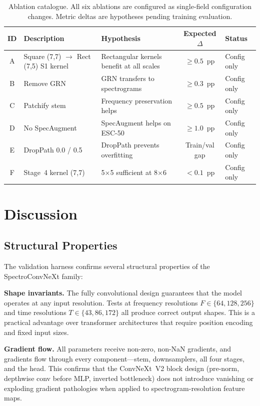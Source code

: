 \documentclass{article}
\begin{document}
\begin{table}[h]
  \centering
  \caption{Ablation catalogue. All six ablations are configured as single-field
  configuration changes. Metric deltas are hypotheses pending training
  evaluation.}
  \label{tab:ablations}
  \small
  \begin{tabular}{cp{3cm}p{2.5cm}c}
  \toprule
  \textbf{ID} & \textbf{Description} & \textbf{Hypothesis} & \textbf{Expected $\Delta$} & \textbf{Status} \\
  \midrule
  A & Square (7,7) $\to$ Rect (7,5) S1 kernel & Rectangular kernels benefit at all scales & $\geq 0.5$~pp & Config only \\
  B & Remove GRN & GRN transfers to spectrograms & $\geq 0.3$~pp & Config only \\
  C & Patchify stem & Frequency preservation helps & $\geq 0.5$~pp & Config only \\
  D & No SpecAugment & SpecAugment helps on ESC-50 & $\geq 1.0$~pp & Config only \\
  E & DropPath 0.0 / 0.5 & DropPath prevents overfitting & Train/val gap & Config only \\
  F & Stage~4 kernel (7,7) & 5$\times$5 sufficient at 8$\times$6 & $< 0.1$~pp & Config only \\
  \bottomrule
  \end{tabular}
\end{table}

\section{Discussion}

\subsection{Structural Properties}

The validation harness confirms several structural properties of the
SpectroConvNeXt family:

\textbf{Shape invariants.} The fully convolutional design guarantees that the
model operates at any input resolution. Tests at frequency resolutions
$F \in \{64, 128, 256\}$ and time resolutions $T \in \{43, 86, 172\}$ all
produce correct output shapes. This is a practical advantage over transformer
architectures that require position encoding and fixed input sizes.

\textbf{Gradient flow.} All parameters receive non-zero, non-NaN gradients, and
gradients flow through every component---stem, downsamplers, all four stages, and
the head. This confirms that the ConvNeXt~V2 block design (pre-norm, depthwise
conv before MLP, inverted bottleneck) does not introduce vanishing or exploding
gradient pathologies when applied to spectrogram-resolution feature maps.
\end{document}

